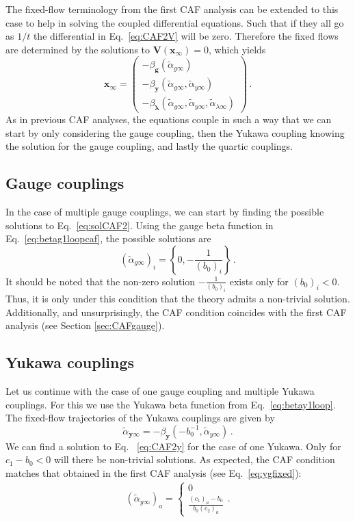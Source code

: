 The fixed-flow terminology from the first CAF analysis can be extended to this case to help in solving the coupled differential equations. Such that if they all go as $1/t$ the differential in Eq.~\eqref{eq:CAF2V} will be zero. Therefore the fixed flows are determined by the solutions to $\boldsymbol{V}(\boldsymbol{ x}_\infty)=0$, which yields 
\begin{equation}
     \boldsymbol{x}_\infty=\begin{pmatrix}
        -\beta_{{\boldsymbol{g}}}(\tilde\alpha_{g\infty})\\-\beta_{{\boldsymbol{y}}}(\tilde\alpha_{g\infty},\tilde\alpha_{y\infty})\\-\beta_{\boldsymbol{\lambda}}(\tilde\alpha_{g\infty},\tilde\alpha_{y\infty},\tilde\alpha_{\lambda\infty})
    \end{pmatrix}\label{eq:solCAF2}\,.
\end{equation}
As in previous CAF analyses, the equations couple in such a way that we can start by only considering the gauge coupling, then the Yukawa coupling knowing the solution for the gauge coupling, and lastly the quartic couplings. 

\subsection{Gauge couplings }In the case of multiple gauge couplings, we can start by finding the possible solutions to Eq.~\eqref{eq:solCAF2}. Using the gauge beta function in Eq.~\eqref{eq:betag1loopcaf}, the possible solutions are
\begin{equation}
   (\tilde\alpha_{g\infty})_i= \left\{0,-\frac 1{(b_0)_i}\right\}
        \,.
\end{equation}
It should be noted that the non-zero solution $-\frac{1}{(b_0)_i}$ exists only for $(b_0)_i<0$. Thus, it is only under this condition that the theory admits a non-trivial solution. Additionally, and unsurprisingly, the CAF condition coincides with the first CAF analysis (see Section \ref{sec:CAFgauge}).

\subsection{Yukawa couplings }Let us continue with the case of one gauge coupling and multiple Yukawa couplings. For this we use the Yukawa beta function from Eq.~\eqref{eq:betay1loop}. The fixed-flow trajectories of the Yukawa couplings are given by
\begin{equation}
   \tilde\alpha_{\boldsymbol{y}\infty}= - \beta_{\boldsymbol y}(-b_0^{-1}, \tilde\alpha_{y\infty})\,. \label{eq:CAF2y}
\end{equation}
We can find a solution to Eq.~ \eqref{eq:CAF2y} for the case of one Yukawa. Only for $c_1-b_0<0$ will there be non-trivial solutions. As expected, the CAF condition matches that obtained in the first CAF analysis (see Eq.~\eqref{eq:ygfixed}):
\begin{align} 
    (\tilde\alpha_{y\infty})_a=\begin{cases}
       0\\\frac {(c_1)_{a}-b_0}{b_0(c_2)_a}
    \end{cases}.
\end{align}
